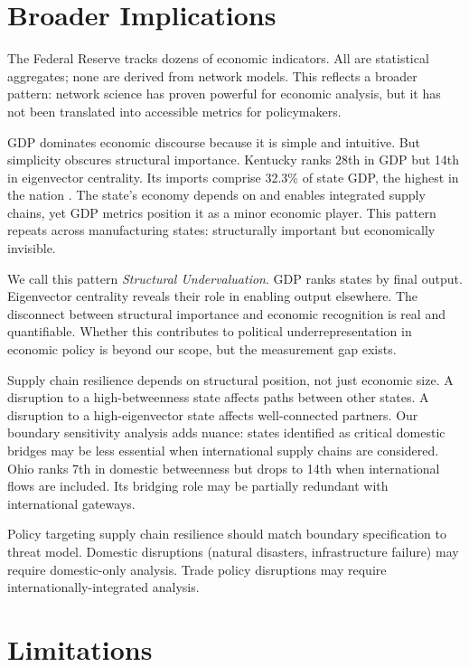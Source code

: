 \documentclass[12pt,oneside]{book}
\begin{document}
\section{Broader Implications}

The Federal Reserve tracks dozens of economic indicators. All are statistical aggregates; none are derived from network models. This reflects a broader pattern: network science has proven powerful for economic analysis, but it has not been translated into accessible metrics for policymakers.

GDP dominates economic discourse because it is simple and intuitive. But simplicity obscures structural importance. Kentucky ranks 28th in GDP but 14th in eigenvector centrality. Its imports comprise 32.3\% of state GDP, the highest in the nation \cite{bea_gdp_state_2024}. The state's economy depends on and enables integrated supply chains, yet GDP metrics position it as a minor economic player. This pattern repeats across manufacturing states: structurally important but economically invisible.

We call this pattern \emph{Structural Undervaluation}. GDP ranks states by final output. Eigenvector centrality reveals their role in enabling output elsewhere. The disconnect between structural importance and economic recognition is real and quantifiable. Whether this contributes to political underrepresentation in economic policy is beyond our scope, but the measurement gap exists.

Supply chain resilience depends on structural position, not just economic size. A disruption to a high-betweenness state affects paths between other states. A disruption to a high-eigenvector state affects well-connected partners. Our boundary sensitivity analysis adds nuance: states identified as critical domestic bridges may be less essential when international supply chains are considered. Ohio ranks 7th in domestic betweenness but drops to 14th when international flows are included. Its bridging role may be partially redundant with international gateways.

Policy targeting supply chain resilience should match boundary specification to threat model. Domestic disruptions (natural disasters, infrastructure failure) may require domestic-only analysis. Trade policy disruptions may require internationally-integrated analysis.


\section{Limitations}
\end{document}
